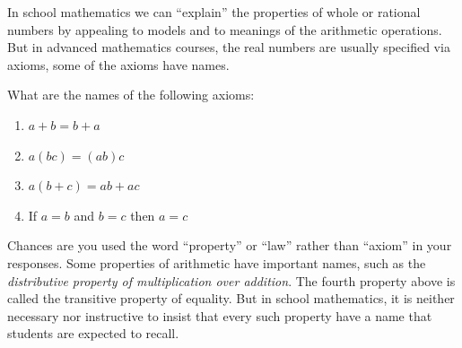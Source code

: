 
\begin{question}
In school mathematics we can ``explain'' the properties of whole or rational numbers by appealing to models and to meanings of the arithmetic operations.  But in advanced mathematics courses, the real numbers are usually specified via axioms, some of the axioms have names.  

What are the names of the following axioms:  
\begin{enumerate}
\item $a + b = b + a$  
\item $a(bc) = (ab)c$
\item $a(b+c) = ab + ac$
\item If $a = b$ and $b = c$ then $a = c$ 
\end{enumerate}
\end{question}
\QM

Chances are you used the word ``property'' or ``law'' rather than ``axiom'' in your responses.  Some properties of arithmetic have important names, such as the \emph{distributive property of multiplication over addition}.  The fourth property above is called the transitive property of equality.  But in school mathematics, it is neither necessary nor instructive to insist that every such property have a name that students are expected to recall.  


%


